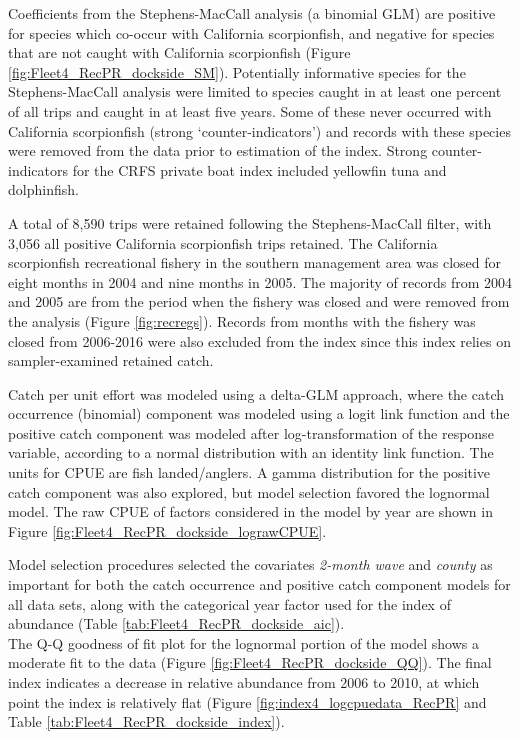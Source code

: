 \documentclass[12pt,]{article}
\begin{document}
Coefficients from the Stephens-MacCall analysis (a binomial GLM) are
positive for species which co-occur with California scorpionfish, and
negative for species that are not caught with California scorpionfish
(Figure \ref{fig:Fleet4_RecPR_dockside_SM}). Potentially informative
species for the Stephens-MacCall analysis were limited to species caught
in at least one percent of all trips and caught in at least five years.
Some of these never occurred with California scorpionfish (strong
`counter-indicators') and records with these species were removed from
the data prior to estimation of the index. Strong counter-indicators for
the CRFS private boat index included yellowfin tuna and dolphinfish.

A total of 8,590 trips were retained following the Stephens-MacCall
filter, with 3,056 all positive California scorpionfish trips retained.
The California scorpionfish recreational fishery in the southern
management area was closed for eight months in 2004 and nine months in
2005. The majority of records from 2004 and 2005 are from the period
when the fishery was closed and were removed from the analysis (Figure
\ref{fig:recregs}). Records from months with the fishery was closed from
2006-2016 were also excluded from the index since this index relies on
sampler-examined retained catch.

Catch per unit effort was modeled using a delta-GLM approach, where the
catch occurrence (binomial) component was modeled using a logit link
function and the positive catch component was modeled after
log-transformation of the response variable, according to a normal
distribution with an identity link function. The units for CPUE are fish
landed/anglers. A gamma distribution for the positive catch component
was also explored, but model selection favored the lognormal model. The
raw CPUE of factors considered in the model by year are shown in Figure
\ref{fig:Fleet4_RecPR_dockside_lograwCPUE}.

Model selection procedures selected the covariates \emph{2-month wave}
and \emph{county} as important for both the catch occurrence and
positive catch component models for all data sets, along with the
categorical year factor used for the index of abundance (Table
\ref{tab:Fleet4_RecPR_dockside_aic}).\\
The Q-Q goodness of fit plot for the lognormal portion of the model
shows a moderate fit to the data (Figure
\ref{fig:Fleet4_RecPR_dockside_QQ}). The final index indicates a
decrease in relative abundance from 2006 to 2010, at which point the
index is relatively flat (Figure \ref{fig:index4_logcpuedata_RecPR} and
Table \ref{tab:Fleet4_RecPR_dockside_index}).
\end{document}
